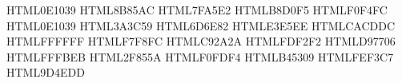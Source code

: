 \usepackage{xcolor}
\definecolor{unooNavy}        {HTML}{0E1039}  %
\definecolor{unooLavender}    {HTML}{8B85AC}  %
\definecolor{unooBlue}        {HTML}{7FA5E2}  %
\definecolor{unooBlueLight}   {HTML}{B8D0F5}  %
\definecolor{unooBlueWash}    {HTML}{F0F4FC}  %
\definecolor{unooInk}         {HTML}{0E1039}  %
\definecolor{unooInkSoft}     {HTML}{3A3C59}  %
\definecolor{unooMuted}       {HTML}{6D6E82}  %
\definecolor{unooGrid}        {HTML}{E3E5EE}  %
\definecolor{unooAxis}        {HTML}{CACDDC}  %
\definecolor{unooSurface}     {HTML}{FFFFFF}  %
\definecolor{unooPaper}       {HTML}{F7F8FC}  %
\definecolor{unooRed}         {HTML}{C92A2A}  %
\definecolor{unooRedWash}     {HTML}{FDF2F2}
\definecolor{unooOrange}      {HTML}{D97706}  %
\definecolor{unooOrangeWash}  {HTML}{FFFBEB}
\definecolor{unooGreen}       {HTML}{2F855A}  %
\definecolor{unooGreenWash}   {HTML}{F0FDF4}
\definecolor{unooYellow}      {HTML}{B45309}
\definecolor{unooYellowWash}  {HTML}{FEF3C7}
\definecolor{unooPink}        {HTML}{9D4EDD}

\usepackage{booktabs}
\usepackage{tabularx}
\usepackage{longtable}
\usepackage{array}
\usepackage{multirow}
\usepackage{makecell}
\usepackage{colortbl}
\usepackage{ltablex}          %
\keepXColumns
\renewcommand{\arraystretch}{1.22}
\setlength{\aboverulesep}{0pt}
\setlength{\belowrulesep}{0pt}
\setlength{\extrarowheight}{2pt}

\usepackage{etoolbox}

